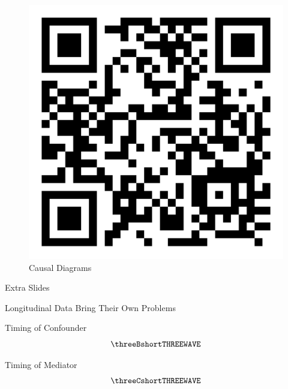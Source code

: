 \documentclass[
  ignorenonframetext,
  aspectratio=169,
]{beamer}
\begin{document}
\begin{frame}
\begin{figure}[H]

{\centering \includegraphics{qr-causal-diagrams.png}

}

\caption{Causal Diagrams}

\end{figure}%
\end{frame}

\begin{frame}{Extra Slides}
\label{extra-slides}
\end{frame}

\begin{frame}{Longitudinal Data Bring Their Own Problems}
\label{longitudinal-data-bring-their-own-problems}
\end{frame}

\begin{frame}{Timing of Confounder}
\label{timing-of-confounder}
\[ 
\threeBshortTHREEWAVE 
\]
\end{frame}

\begin{frame}{Timing of Mediator}
\label{timing-of-mediator}
\[
\threeCshortTHREEWAVE
\]
\end{frame}
\end{document}
